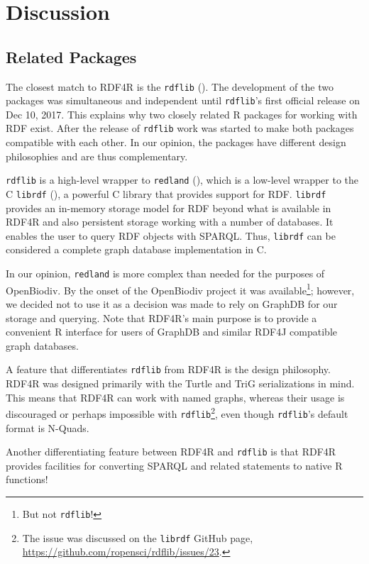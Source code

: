 \section{Discussion}

\subsection{Related Packages}

The closest match to RDF4R is the {\tt rdflib} (\cite{boettiger_rdflib:_2018}). The development of the two packages was simultaneous and independent until {\tt rdflib}'s first official release on Dec 10, 2017. This explains why two closely related R packages for working with RDF exist. After the release of {\tt rdflib} work was started  to make both packages compatible with each other. In our opinion, the packages have different design philosophies and are thus complementary.

{\tt rdflib} is a high-level wrapper to {\tt redland} (\cite{jones_redland:_2016}), which is a low-level wrapper to the C {\tt librdf} (\cite{beckett_redland_2014}), a powerful C library that provides support for RDF. {\tt librdf} provides an in-memory storage model for RDF beyond what is available in RDF4R and also persistent storage working with a number of databases. It enables the user to query RDF objects with SPARQL. Thus, {\tt librdf} can be considered a complete graph database implementation in C.

In our opinion, {\tt redland} is more complex than needed for the purposes of OpenBiodiv. By the onset of the OpenBiodiv project it was available\footnote{But not {\tt rdflib}!}; however, we decided not to use it as a decision was made to rely on GraphDB for our storage and querying. Note that RDF4R's main purpose is to provide a convenient R interface for users of GraphDB and similar RDF4J compatible graph databases.

A feature that differentiates {\tt rdflib} from RDF4R is the design philosophy. RDF4R was designed primarily with the Turtle and TriG serializations in mind. This means that RDF4R can work with named graphs, whereas their usage is discouraged or perhaps impossible with {\tt rdflib}\footnote{The issue was discussed on the {\tt librdf} GitHub page, \url{https://github.com/ropensci/rdflib/issues/23}.}, even though {\tt rdflib}'s default format is N-Quads.

Another differentiating feature between RDF4R and {\tt rdflib} is that RDF4R provides facilities for converting SPARQL and related statements to native R functions!

